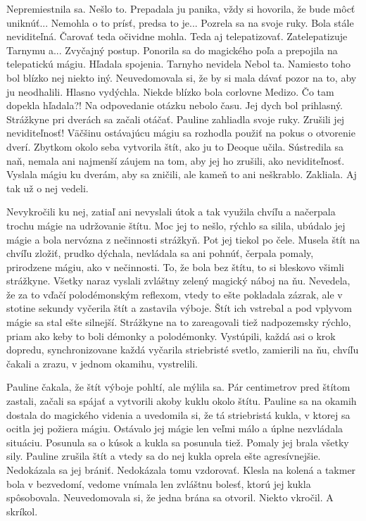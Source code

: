 \documentclass{book}
\begin{document}
Nepremiestnila sa. Nešlo to. Prepadala ju panika, vždy si hovorila, že bude môcť uniknúť... Nemohla o to prísť, predsa to je... Pozrela sa na svoje ruky. Bola stále neviditeľná. Čarovať teda očividne mohla. Teda aj telepatizovať. Zatelepatizuje Tarnymu a... Zvyčajný postup. Ponorila sa do magického poľa a prepojila na telepatickú mágiu. Hľadala spojenia. Tarnyho nevidela Nebol ta. Namiesto toho bol blízko nej niekto iný. Neuvedomovala si, že by si mala dávať pozor na to, aby ju neodhalili. Hlasno vydýchla. Niekde blízko bola corlovne Medizo. Čo tam dopekla hľadala?! Na odpovedanie otázku nebolo času. Jej dych bol prihlasný. Strážkyne pri dverách sa začali otáčať. Pauline zahliadla svoje ruky. Zrušili jej neviditeľnosť! Väčšinu ostávajúcu mágiu sa rozhodla použiť na pokus o otvorenie dverí. Zbytkom okolo seba vytvorila štít, ako ju to Deoque učila. Sústredila sa naň, nemala ani najmenší záujem na tom, aby jej ho zrušili, ako neviditeľnosť. Vyslala mágiu ku dverám, aby sa zničili, ale kameň to ani neškrablo. Zakliala. Aj tak už o nej vedeli.

Nevykročili ku nej, zatiaľ ani nevyslali útok a tak využila chvíľu a načerpala trochu mágie na udržovanie štítu. Moc jej to nešlo, rýchlo sa silila, ubúdalo jej mágie a bola nervózna z nečinnosti strážkyň. Pot jej tiekol po čele. Musela štít na chvíľu zložiť, prudko dýchala, nevládala sa ani pohnúť, čerpala pomaly, prirodzene mágiu, ako v nečinnosti. To, že bola bez štítu, to si bleskovo všimli strážkyne. Všetky naraz vyslali zvláštny zelený magický náboj na ňu. Nevedela, že za to vďačí polodémonským reflexom, vtedy to ešte pokladala zázrak, ale v stotine sekundy vyčerila štít a zastavila výboje. Štít ich vstrebal a pod vplyvom mágie sa stal ešte silnejší. Strážkyne na to zareagovali tiež nadpozemsky rýchlo, priam ako keby to boli démonky a polodémonky. Vystúpili, každá asi o krok dopredu, synchronizovane každá vyčarila striebristé svetlo, zamierili na ňu, chvíľu čakali a zrazu, v jednom okamihu, vystrelili.

Pauline čakala, že štít výboje pohltí, ale mýlila sa. Pár centimetrov pred štítom zastali, začali sa spájať a vytvorili akoby kuklu okolo štítu. Pauline sa na okamih dostala do magického videnia a uvedomila si, že tá striebristá kukla, v ktorej sa ocitla jej požiera mágiu. Ostávalo jej mágie len veľmi málo a úplne nezvládala situáciu. Posunula sa o kúsok a kukla sa posunula tiež. Pomaly jej brala všetky sily. Pauline zrušila štít a vtedy sa do nej kukla oprela ešte agresívnejšie. Nedokázala sa jej brániť. Nedokázala tomu vzdorovať. Klesla na kolená a takmer bola v bezvedomí, vedome vnímala len zvláštnu bolesť, ktorú jej kukla spôsobovala. Neuvedomovala si, že jedna brána sa otvoril. Niekto vkročil. A skríkol.
\end{document}
